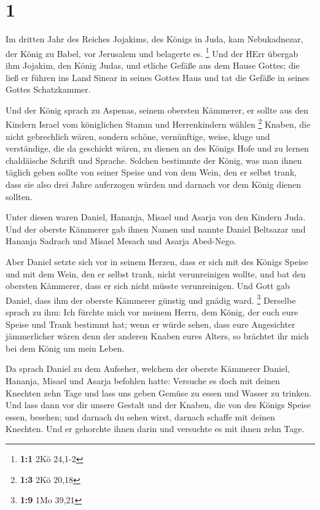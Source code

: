 \hypertarget{section}{%
\section{1}\label{section}}

 Im dritten Jahr des Reiches Jojakims, des Königs in Juda,
kam Nebukadnezar, der König zu Babel, vor Jerusalem und belagerte es.
\footnote{\textbf{1:1} 2Kö 24,1-2}  Und der HErr übergab ihm
Jojakim, den König Judas, und etliche Gefäße aus dem Hause Gottes; die
ließ er führen ins Land Sinear in seines Gottes Haus und tat die Gefäße
in seines Gottes Schatzkammer.

 Und der König sprach zu Aspenas, seinem obersten Kämmerer,
er sollte aus den Kindern Israel vom königlichen Stamm und Herrenkindern
wählen \footnote{\textbf{1:3} 2Kö 20,18}  Knaben, die nicht
gebrechlich wären, sondern schöne, vernünftige, weise, kluge und
verständige, die da geschickt wären, zu dienen an des Königs Hofe und zu
lernen chaldäische Schrift und Sprache.  Solchen bestimmte
der König, was man ihnen täglich geben sollte von seiner Speise und von
dem Wein, den er selbst trank, dass sie also drei Jahre auferzogen
würden und darnach vor dem König dienen sollten.

 Unter diesen waren Daniel, Hananja, Misael und Asarja von
den Kindern Juda.  Und der oberste Kämmerer gab ihnen Namen
und nannte Daniel Beltsazar und Hananja Sadrach und Misael Mesach und
Asarja Abed-Nego.

 Aber Daniel setzte sich vor in seinem Herzen, dass er sich
mit des Königs Speise und mit dem Wein, den er selbst trank, nicht
verunreinigen wollte, und bat den obersten Kämmerer, dass er sich nicht
müsste verunreinigen.  Und Gott gab Daniel, dass ihm der
oberste Kämmerer günstig und gnädig ward. \footnote{\textbf{1:9} 1Mo
  39,21}  Derselbe sprach zu ihm: Ich fürchte mich vor
meinem Herrn, dem König, der euch eure Speise und Trank bestimmt hat;
wenn er würde sehen, dass eure Angesichter jämmerlicher wären denn der
anderen Knaben eures Alters, so brächtet ihr mich bei dem König um mein
Leben.

 Da sprach Daniel zu dem Aufseher, welchem der oberste
Kämmerer Daniel, Hananja, Misael und Asarja befohlen hatte:
 Versuche es doch mit deinen Knechten zehn Tage und lass
uns geben Gemüse zu essen und Wasser zu trinken.  Und lass
dann vor dir unsere Gestalt und der Knaben, die von des Königs Speise
essen, besehen; und darnach du sehen wirst, darnach schaffe mit deinen
Knechten.  Und er gehorchte ihnen darin und versuchte es
mit ihnen zehn Tage.

